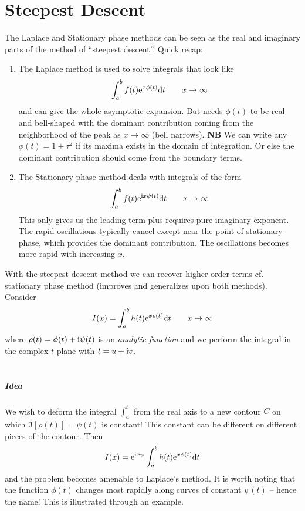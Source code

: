 \chapter{Steepest Descent}
The Laplace and Stationary phase methods can be seen as the real and imaginary parts of the method of ``steepest descent''. Quick recap:
\begin{enumerate}
	\item The Laplace method is used to solve integrals that look like
	\begin{gather*}
		\int_{a}^{b} f(t) \mathrm{e}^{x \phi(t)} \mathrm{d} t \qquad x \rightarrow \infty 
	\end{gather*}
	and can give the whole asymptotic expansion. But needs $\phi(t)$ to be real and bell-shaped with the dominant contribution coming from the neighborhood of the peak as $x \rightarrow \infty$ (bell narrows). {\bf NB} We can write any $\phi(t) = 1+ \tau^2$ if its maxima exists in the domain of integration. Or else the dominant contribution should come from the boundary terms.  
	\item The Stationary phase method deals with integrals of the form
	\begin{gather*}
		\int_{a}^{b} f(t)\mathrm{e}^{\mathrm{i} x \psi(t)} \mathrm{d} t \qquad x \rightarrow \infty 
	\end{gather*}
	This only gives us the leading term plus requires pure imaginary exponent. The rapid oscillations typically cancel except near the point of stationary phase, which provides the dominant contribution. The oscillations becomes more rapid with increasing $x$. 
\end{enumerate}
With the steepest descent method we can recover higher order terms cf. stationary phase method (improves and generalizes upon both methods). Consider
\begin{gather*}
	I(x) = \int_{a}^{b} h(t) \mathrm{e}^{x \rho(t)} \mathrm{d} t \qquad x \rightarrow \infty
\end{gather*}
where $\rho(t) = \phi(t) + \mathrm{i} \psi(t)$ is an \emph{analytic function} and we perform the integral in the complex $t$ plane with $t=u + \mathrm{i} v$. \\
\ \newline
\paragraph{Idea} We wish to deform the integral $\int_{a}^{b}$ from the real axis to a new contour $C$ on which $\Im [\rho(t)] = \psi(t)$ is constant! This constant can be different on different pieces of the contour. Then
\begin{align*}
	I(x) = \mathrm{e}^{\mathrm{i} x \psi}\int_{a}^{b} h(t) \mathrm{e}^{x \phi(t)} \mathrm{d} t
\end{align*}
and the problem becomes amenable to Laplace's method. It is worth noting that the function $\phi(t)$ changes most rapidly along curves of constant $\psi(t)$ -- hence the name! This is illustrated through an example.

